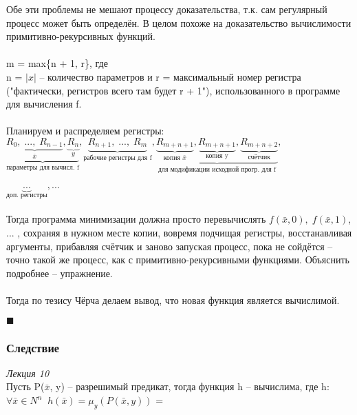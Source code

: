         Обе эти проблемы не мешают процессу доказательства, т.к. сам регулярный процесс может быть определён. В целом похоже на доказательство вычислимости примитивно-рекурсивных функций.\\
        \\m = max\{n + 1, r\}, где\\
        n = $|x|$ -- количество параметров и r = максимальный номер регистра ("фактически, регистров всего там будет r + 1"), использованного в программе для вычисления f.\\
        \\Планируем и распределяем регистры:\\
        $\underbrace{\underbrace{R_0, \; ... , \; R_{n - 1}}_{\bar x} , \underbrace{R_n}_{y}}_{\text{параметры для вычисл. f}}, \underbrace{R_{n + 1}, \; ... , \; R_m}_{\text{рабочие регистры для f}}, \underbrace{\underbrace{R_{m + n + 1}}_{\text{копия } \bar x}, \underbrace{R_{m + n + 1}}_{\text{копия y}}, \underbrace{R_{m + n + 2}}_{\text{счётчик}}}_{\text{для модификации исходной прогр. для f}},$\\
        \\$\underbrace{...}_{\text{доп. регистры}}, ...  $\\
        \\Тогда программа минимизации должна просто перевычислять $f(\bar x, 0), \; f(\bar x, 1)$, ... , сохраняя в нужном месте копии, вовремя подчищая регистры, восстанавливая аргументы, прибавляя счётчик и заново запуская процесс, пока не сойдётся -- точно такой же процесс, как с примитивно-рекурсивными функциями. Объяснить подробнее -- упражнение.\\
        \\Тогда по тезису Чёрча делаем вывод, что новая функция является вычислимой.
        \begin{flushright}
            $\blacksquare$\\
        \end{flushright}
        
        \subsubsection{Следствие}
        \emph{Лекция 10}\\
        
            Пусть P($\bar x$, y) -- разрешимый предикат, тогда функция h -- вычислима, где h:\\
            
            $\forall \bar x \in N^n \; \; h(\bar x) = \mu_y(P(\bar x, y))$ = \\
            
